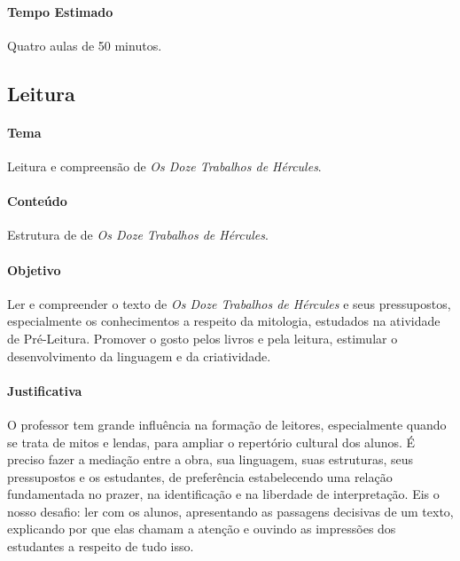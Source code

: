 \documentclass[11pt]{extarticle}
\begin{document}

\paragraph{Tempo Estimado} Quatro aulas de 50 minutos.

\subsection{Leitura}


\paragraph{Tema} Leitura e compreensão de \textit{Os Doze Trabalhos de Hércules}.

\paragraph{Conteúdo} Estrutura de de \textit{Os Doze Trabalhos de Hércules}.  

\paragraph{Objetivo} Ler e compreender o texto de \textit{Os Doze Trabalhos de Hércules} e seus pressupostos, especialmente os conhecimentos a respeito da mitologia, estudados na atividade de Pré-Leitura. Promover o gosto pelos livros e pela leitura, estimular o desenvolvimento da linguagem e da criatividade.   

\paragraph{Justificativa} O professor tem grande influência na formação de leitores, especialmente quando se trata de mitos e lendas, para ampliar o repertório cultural dos alunos. É preciso fazer a mediação entre a obra, sua linguagem, suas estruturas, seus pressupostos e os estudantes, de preferência estabelecendo uma relação fundamentada no prazer, na identificação e na liberdade de interpretação. Eis o nosso desafio: ler com os alunos, apresentando as passagens decisivas de um texto, explicando por que elas chamam a atenção e  ouvindo as impressões dos estudantes a respeito de tudo isso. 
\end{document}

